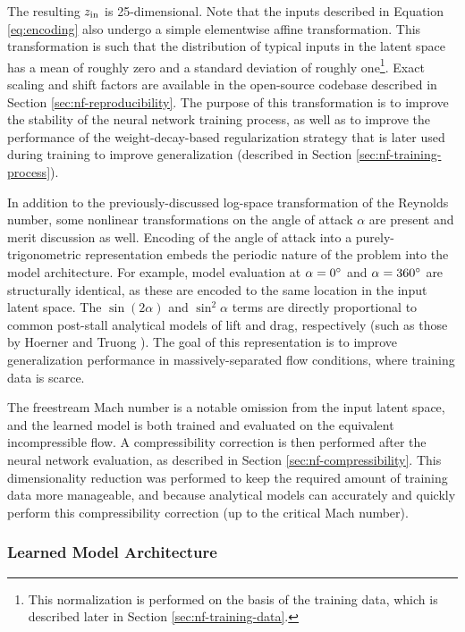     The resulting $z_{\rm in}$ is 25-dimensional. Note that the inputs described in Equation \ref{eq:encoding} also undergo a simple elementwise affine transformation. This transformation is such that the distribution of typical inputs in the latent space has a mean of roughly zero and a standard deviation of roughly one\footnote{This normalization is performed on the basis of the training data, which is described later in Section \ref{sec:nf-training-data}.}. Exact scaling and shift factors are available in the open-source codebase described in Section \ref{sec:nf-reproducibility}. The purpose of this transformation is to improve the stability of the neural network training process, as well as to improve the performance of the weight-decay-based regularization strategy that is later used during training to improve generalization (described in Section \ref{sec:nf-training-process}).

    In addition to the previously-discussed log-space transformation of the Reynolds number, some nonlinear transformations on the angle of attack $\alpha$ are present and merit discussion as well. Encoding of the angle of attack into a purely-trigonometric representation embeds the periodic nature of the problem into the model architecture. For example, model evaluation at $\alpha=0\degree$ and $\alpha=360\degree$ are structurally identical, as these are encoded to the same location in the input latent space. The $\sin(2\alpha)$ and $\sin^2\alpha$ terms are directly proportional to common post-stall analytical models of lift and drag, respectively (such as those by Hoerner and Truong \cite{hoerner_fluiddynamic_1992, truong_analytical_2020}). The goal of this representation is to improve generalization performance in massively-separated flow conditions, where training data is scarce.

    The freestream Mach number is a notable omission from the input latent space, and the learned model is both trained and evaluated on the equivalent incompressible flow. A compressibility correction is then performed after the neural network evaluation, as described in Section \ref{sec:nf-compressibility}. This dimensionality reduction was performed to keep the required amount of training data more manageable, and because analytical models can accurately and quickly perform this compressibility correction (up to the critical Mach number).

    \subsubsection{Learned Model Architecture}
    \label{sec:nf-learned-model-architecture}

